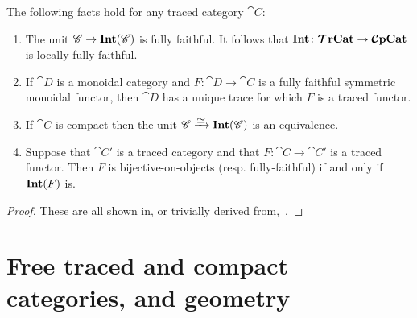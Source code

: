 \documentclass[11pt,oneside,article]{memoir}
\begin{document}
\begin{lemma}\label{lemma:fully_faithful_and_trace}
The following facts hold for any traced category $\cat{C}$:
\begin{enumerate}[label={\upshape\roman*}.]
   \item The unit $\mathscr{C}\to\mathbf{Int}(\mathscr{C})$ is fully faithful. It follows that $\mathbf{Int}\colon\bm{\mathcal{T}}\mathbf{rCat}\to\bm{\mathcal{C}}\mathbf{pCat}$ is locally fully faithful.
   \item If $\cat{D}$ is a monoidal category and $F\colon\cat{D}\to\cat{C}$ is a fully faithful symmetric
      monoidal functor, then $\cat{D}$ has a unique trace for which $F$ is a traced functor.
   \item If $\cat{C}$ is compact then the unit  $\cat{C}\To{\raisebox{-1ex}{$\equiv$}}\Int(\cat{C})$ is an equivalence.
   \item Suppose that $\cat{C'}$ is a traced category and that $F\colon \cat{C}\to \cat{C}'$ is a
      traced functor. Then $F$ is bijective-on-objects (resp. fully-faithful) if and only if
      $\mathbf{Int}(F)$ is.
\end{enumerate}
\end{lemma}
\begin{proof}
   These are all shown in, or trivially derived from,~\cite{JoyalStreetVerity}.
\end{proof}

\section{Free traced and compact categories, and geometry }\label{sec:free_and_geometry}
\end{document}
